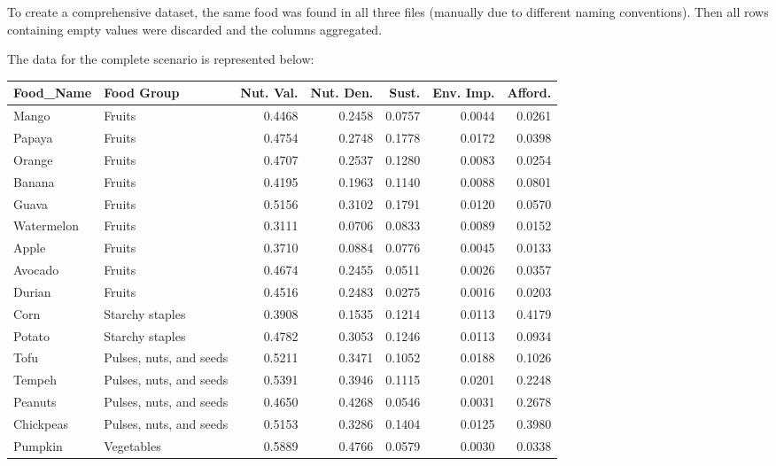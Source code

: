 To create a comprehensive dataset, the same food was found in all three files (manually due to different naming conventions). Then all rows containing empty values were discarded and the columns aggregated.

The data for the complete scenario is represented below:
\begin{table}[ht]
\centering
\scriptsize
\label{tab:food_data}
\begin{tabular}{llrrrrr}
\toprule
\textbf{Food\_Name} & \textbf{Food Group}      & \textbf{Nut. Val.} & \textbf{Nut. Den.} & \textbf{Sust.} & \textbf{Env. Imp.} & \textbf{Afford.} \\
\midrule
Mango          & Fruits                & 0.4468 & 0.2458 & 0.0757 & 0.0044 & 0.0261 \\
Papaya         & Fruits                & 0.4754 & 0.2748 & 0.1778 & 0.0172 & 0.0398 \\
Orange         & Fruits                & 0.4707 & 0.2537 & 0.1280 & 0.0083 & 0.0254 \\
Banana         & Fruits                & 0.4195 & 0.1963 & 0.1140 & 0.0088 & 0.0801 \\
Guava          & Fruits                & 0.5156 & 0.3102 & 0.1791 & 0.0120 & 0.0570 \\
Watermelon     & Fruits                & 0.3111 & 0.0706 & 0.0833 & 0.0089 & 0.0152 \\
Apple          & Fruits                & 0.3710 & 0.0884 & 0.0776 & 0.0045 & 0.0133 \\
Avocado        & Fruits                & 0.4674 & 0.2455 & 0.0511 & 0.0026 & 0.0357 \\
Durian         & Fruits                & 0.4516 & 0.2483 & 0.0275 & 0.0016 & 0.0203 \\
Corn           & Starchy staples       & 0.3908 & 0.1535 & 0.1214 & 0.0113 & 0.4179 \\
Potato         & Starchy staples       & 0.4782 & 0.3053 & 0.1246 & 0.0113 & 0.0934 \\
Tofu           & Pulses, nuts, and seeds & 0.5211 & 0.3471 & 0.1052 & 0.0188 & 0.1026 \\
Tempeh         & Pulses, nuts, and seeds & 0.5391 & 0.3946 & 0.1115 & 0.0201 & 0.2248 \\
Peanuts        & Pulses, nuts, and seeds & 0.4650 & 0.4268 & 0.0546 & 0.0031 & 0.2678 \\
Chickpeas      & Pulses, nuts, and seeds & 0.5153 & 0.3286 & 0.1404 & 0.0125 & 0.3980 \\
Pumpkin        & Vegetables            & 0.5889 & 0.4766 & 0.0579 & 0.0030 & 0.0338 \\

\end{tabular}
\end{table}
